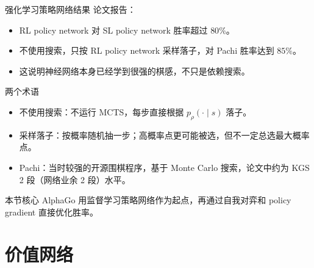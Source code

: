 \documentclass[UTF8,aspectratio=169,10pt]{ctexbeamer}
\begin{document}
\begin{frame}{强化学习策略网络结果}
  \small
  论文报告：

  \begin{itemize}
    \item RL policy network 对 SL policy network 胜率超过 $80\%$。
    \item 不使用搜索，只按 RL policy network 采样落子，对 Pachi 胜率达到 $85\%$。
    \item 这说明神经网络本身已经学到很强的棋感，不只是依赖搜索。
  \end{itemize}

  \begin{block}{两个术语}
    \begin{itemize}
      \item 不使用搜索：不运行 MCTS，每步直接根据 $p_{\rho}(\cdot\mid s)$ 落子。
      \item 采样落子：按概率随机抽一步；高概率点更可能被选，但不一定总选最大概率点。
      \item Pachi：当时较强的开源围棋程序，基于 Monte Carlo 搜索，论文中约为 KGS 2 段（网络业余 2 段）水平。
    \end{itemize}
  \end{block}

  \begin{block}{本节核心}
    AlphaGo 用监督学习策略网络作为起点，再通过自我对弈和 policy gradient 直接优化胜率。
  \end{block}
\end{frame}

\section{价值网络}
\end{document}
